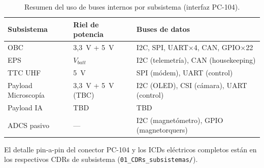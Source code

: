\begin{table}[h]
\centering
\caption{Resumen del uso de buses internos por subsistema (interfaz PC-104).}
\label{tab:icd_buses}
\begin{tabular}{lp{3cm}p{6.5cm}}
\toprule
\textbf{Subsistema} & \textbf{Riel de potencia} & \textbf{Buses de datos} \\
\midrule
OBC                & 3{,}3~V + 5~V & I2C, SPI, UART$\times$4, CAN, GPIO$\times$22 \\
EPS                & $V_{batt}$    & I2C (telemetría), CAN (housekeeping) \\
TTC UHF            & 5~V           & SPI (módem), UART (control) \\
Payload Microscopía & 3{,}3~V + 5~V (TBC) & I2C (OLED), CSI (cámara), UART (control) \\
Payload IA         & TBD           & TBD \\
ADCS pasivo        & ---           & I2C (magnetómetro), GPIO (magnetorquers) \\
\bottomrule
\end{tabular}
\end{table}

El detalle pin-a-pin del conector PC-104 y los ICDs eléctricos completos están en los respectivos CDRs de subsistema (\texttt{01\_CDRs\_subsistemas/}).
